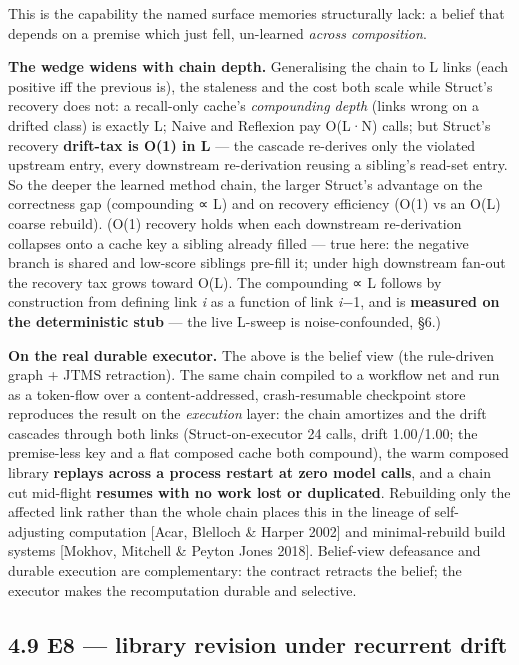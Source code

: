\documentclass[11pt]{article}
\begin{document}
This is the capability the named surface memories structurally lack: a belief that depends on a premise which just fell, un-learned \emph{across composition}.

\textbf{The wedge widens with chain depth.} Generalising the chain to L links (each positive iff the previous is), the staleness and the cost both scale while Struct's recovery does not: a recall-only cache's \emph{compounding depth} (links wrong on a drifted class) is exactly L; Naive and Reflexion pay O(L·N) calls; but Struct's recovery \textbf{drift-tax is O(1) in L} — the cascade re-derives only the violated upstream entry, every downstream re-derivation reusing a sibling's read-set entry. So the deeper the learned method chain, the larger Struct's advantage on the correctness gap (compounding ∝ L) and on recovery efficiency (O(1) vs an O(L) coarse rebuild). (O(1) recovery holds when each downstream re-derivation collapses onto a cache key a sibling already filled — true here: the negative branch is shared and low-score siblings pre-fill it; under high downstream fan-out the recovery tax grows toward O(L). The compounding ∝ L follows by construction from defining link \emph{i} as a function of link \emph{i}−1, and is \textbf{measured on the deterministic stub} — the live L-sweep is noise-confounded, §6.)

\textbf{On the real durable executor.} The above is the belief view (the rule-driven graph + JTMS retraction). The same chain compiled to a workflow net and run as a token-flow over a content-addressed, crash-resumable checkpoint store reproduces the result on the \emph{execution} layer: the chain amortizes and the drift cascades through both links (Struct-on-executor 24 calls, drift 1.00/1.00; the premise-less key and a flat composed cache both compound), the warm composed library \textbf{replays across a process restart at zero model calls}, and a chain cut mid-flight \textbf{resumes with no work lost or duplicated}. Rebuilding only the affected link rather than the whole chain places this in the lineage of self-adjusting computation [Acar, Blelloch \& Harper 2002] and minimal-rebuild build systems [Mokhov, Mitchell \& Peyton Jones 2018]. Belief-view defeasance and durable execution are complementary: the contract retracts the belief; the executor makes the recomputation durable and selective.

\subsection*{4.9 E8 — library revision under recurrent drift}
\end{document}
